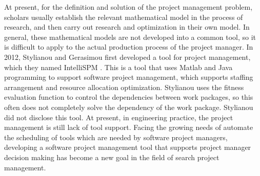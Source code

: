At present, for the definition and solution of the project management 
problem, scholars usually establish the relevant mathematical model in the 
process of research, and then carry out research and optimization in their 
own model. In general, these mathematical models are not developed into a 
common tool, so it is difficult to apply to the actual production process of 
the project manager. In 2012, Stylianou and Gerasimou first developed a tool 
for project management, which they named IntelliSPM \cite{stylianou}. This is
a tool that uses Matlab and Java programming to support software project
management, which supports staffing arrangement and resource allocation
optimization. Stylianou uses the fitness evaluation function to control the
dependencies between work packages, so this often does not completely solve
the dependency of the work package. Stylianou did not disclose this tool.
At present, in engineering practice, the project management is still lack of
tool support. Facing the growing needs of automate the scheduling of tools
which are needed by software project managers, developing a software project
management tool that supports project manager decision making has become a
new goal in the field of search project management.

